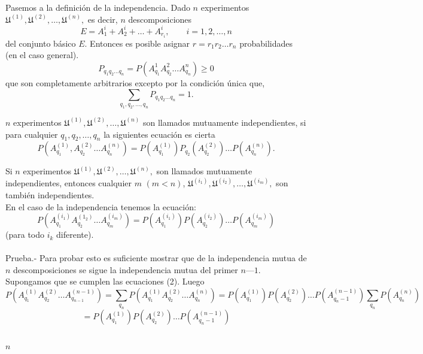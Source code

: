 Pasemos a la definición de la independencia. Dado $n$ experimentos $\mathfrak{U}^{(1)},\mathfrak{U}^{(2)},\ldots,\mathfrak{U}^{(n)},$ es decir, $n$ descomposiciones 
$$E=A_1^{i} +A_2^{i} + \ldots + A_{r_i}^{i}, \qquad i=1,2,\ldots,n$$
del conjunto básico $E$. Entonces es posible asignar $r=r_1 r_2 \ldots r_n$ probabilidades (en el caso general).
$$P_{q_1 q_2 \ldots q_n} = P(A_{q_1}^{1} A_{q_2}^{2} \ldots A_{q_n}^{n}) \geq 0$$
que son completamente arbitrarios excepto por la condición única que,
\begin{equation}
    \sum_{q_1, q_2,\ldots,q_n} P_{q_1 q_2 \ldots q_n} = 1.
\end{equation}

\begin{tcolorbox}[colframe=white]
    \begin{def.} $n$ experimentos $\mathfrak{U}^{(1)}, \mathfrak{U}^{(2)},\ldots,\mathfrak{U}^{(n)}$ son llamados mutuamente independientes, si para cualquier $q_1,q_2,\ldots,q_n$ la siguientes ecuación es cierta
	\begin{equation}
	    P\left(A_{q_1}^{(1)},A_{q_2}^{(2)}\ldots A_{q_n}^{(n)}\right) = P\left(A_{q_1}^{(1)}\right)P_{q_2}\left(A_{q_2}^{(2)}\right)\ldots P\left(A_{q_n}^{(n)}\right). 
	\end{equation}
    \end{def.}
\end{tcolorbox}

\begin{teo}
    Si $n$ experimentos $\mathfrak{U}^{(1)},\mathfrak{U}^{(2)},\ldots,\mathfrak{U}^{(n)},$ son llamados mutuamente independientes, entonces cualquier $m$ $(m<n)$,  $\mathfrak{U}^{(i_1)},\mathfrak{U}^{(i_2)},\ldots,\mathfrak{U}^{(i_m)},$ son también independientes.\\
    En el caso de la independencia tenemos la ecuación:
    \begin{equation}
	P\left(A_{q_1}^{(i_1)} A_{q_2}^{(1_2)} \ldots A_{q_m}^{(i_m)} \right) = P\left(A_{q_1}^{(i_1)}\right)P\left(A_{q_2}^{(i_2)}\right) \ldots P\left(A_{q_m}^{(i_m)}\right)
    \end{equation}
    (para todo $i_k$ diferente).\\\\

    Prueba.-\; Para probar esto es suficiente mostrar que de la independencia mutua de $n$ descomposiciones se sigue la independencia mutua del primer $n — 1$. Supongamos que se cumplen las ecuaciones (2). Luego
    $$P\left(A_{q_1}^{(1)} A_{q_2}^{(2)} \ldots A_{q_{n-1}}^{(n-1)} \right) = \sum\limits_{q_n} P\left(A_{q_1}^{(1)} A_{q_2}^{(2)}\ldots A_{q_n}^{(n)}\right) = P\left(A_{q_1}^{(1)} \right) P\left(A_{q_2}^{(2)}\right)\ldots P\left(A_{q_n-1}^{(n-1)} \right) \sum\limits_{q_n} P\left(A_{q_n}^{(n)}\right)$$ $$ = P\left(A_{q_1}^{(1)} \right) P\left(A_{q_2}^{(2)}\right)\ldots P\left(A_{q_n-1}^{(n-1)} \right)$$\\
\end{teo}

\begin{tcolorbox}[colframe=white]
    \begin{def.} $n$
    \end{def.}
\end{tcolorbox}

